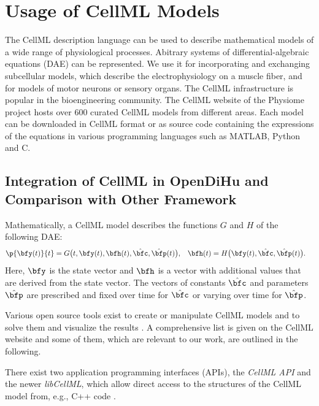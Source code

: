 
\section{Usage of CellML Models}\label{sec:usage_cellml}

The CellML description language can be used to describe mathematical models of a wide range of physiological processes. Abitrary systems of differential-algebraic equations (DAE) can be represented.
We use it for incorporating and exchanging subcellular models, which describe the electrophysiology on a muscle fiber, and for models of motor neurons or sensory organs.
The CellML infrastructure is popular in the bioengineering community. The CellML website of the Physiome project hosts over 600 curated CellML models from different areas. Each model can be downloaded in CellML format or as source code containing the expressions of the equations in various programming languages such as MATLAB, Python and C.

\subsection{Integration of CellML in OpenDiHu and Comparison with Other Framework}

Mathematically, a CellML model describes the functions $G$ and $H$ of the following DAE:
\begin{align}\label{eq:cellml_generic_dae}
  \p{\bfy(t)}{t} &= G\big(t,\bfy(t),\bfh(t),\hat{\bfc},\hat{\bfp}(t)\big), & \bfh(t) &= H\big(\bfy(t),\hat{\bfc},\hat{\bfp}(t)\big).
\end{align}
Here, $\bfy$ is the state vector and $\bfh$ is a vector with additional values that are derived from the state vector. The vectors of constants $\hat{\bfc}$ and parameters $\hat{\bfp}$ are prescribed and fixed over time for $\hat{\bfc}$ or varying over time for $\hat{\bfp}$.

Various open source tools exist to create or manipulate CellML models and to solve them and visualize the results \cite{pmid18579471}. A comprehensive list is given on the CellML website \cite{cellmlWebsite} and some of them, which are relevant to our work, are outlined in the following.

There exist two application programming interfaces (APIs), the \emph{CellML API} and the newer \emph{libCellML}, which allow direct access to the structures of the CellML model from, e.g., C++ code \cite{pmid20377909}. 

